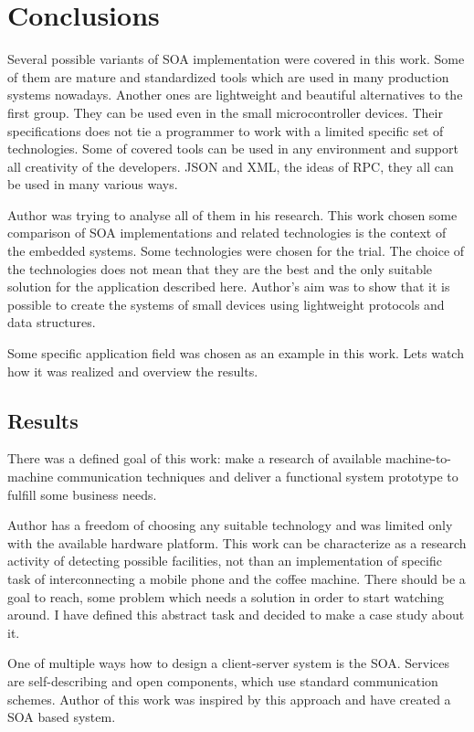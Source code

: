 \section{Conclusions}

Several possible variants of \gls{SOA} implementation were covered in this work.
Some of them are mature and standardized tools which are used in many production
systems nowadays.
Another ones are lightweight and beautiful alternatives to the first group. They
can be  used even in the small microcontroller devices. 
Their specifications does not tie a programmer to work with a limited specific
set of technologies. 
Some of covered tools can be used in any environment and support all creativity
of the developers. 
JSON and XML, the ideas of RPC, they all can be used in many various ways.

Author was trying to analyse all of them in his research.
This work chosen some comparison of SOA implementations and related technologies
is the context of the embedded systems.
Some technologies were chosen for the trial.
The choice of the technologies  does not mean that they are the best and the
only suitable solution for the application described here.
Author's  aim was to show that it is possible to create the systems of small
devices using lightweight protocols and data structures.

Some specific application field was chosen as an example in this work.
Lets watch how it was realized and overview the results.

\subsection{Results}

There was a defined goal of this work: make a research of available
machine-to-machine communication techniques and deliver a functional system
prototype to fulfill some business needs.

Author has a freedom of choosing any suitable technology and was limited only
with the available hardware platform. 
This work can be characterize as a research activity of detecting possible
facilities, not than an implementation of specific task of interconnecting
a mobile phone and the coffee machine.
There should be a goal to reach, some problem which needs a solution in order to
start watching around. 
I have defined this abstract task and decided to make a
case study about it.

One of multiple ways how to design a client-server system is the
\gls{SOA}. Services are self-describing and open components, which use standard
communication schemes. 
Author of this work was inspired by this approach and have created a SOA
based system.


